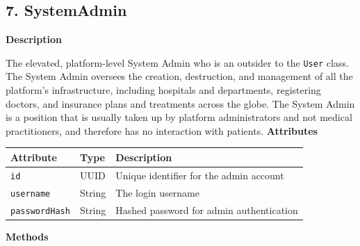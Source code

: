 \documentclass[12pt, a4paper]{article}
\begin{document}
\subsection{7. SystemAdmin}\label{sec:7-systemadmin}

\textbf{Description}

The elevated, platform-level System Admin who is an outsider to the \texttt{User} class. The System Admin oversees the creation, destruction, and management of all the platform's infrastructure, including hospitals and departments, registering doctors, and insurance plans and treatments across the globe. The System Admin is a position that is usually taken up by platform administrators and not medical practitioners, and therefore has no interaction with patients.
\textbf{Attributes}

\begin{center}
\small
\renewcommand{\arraystretch}{1.35}
\begin{tabularx}{\textwidth}{|>{\raggedright\arraybackslash}p{3.4cm}|>{\raggedright\arraybackslash}p{3.3cm}|Y|}
\hline
{}
\textbf{Attribute} & \textbf{Type} & \textbf{Description} \\ \hline
\texttt{id} & UUID & Unique identifier for the admin account \\ \hline
\texttt{username} & String & The login username \\ \hline
\texttt{passwordHash} & String & Hashed password for admin authentication \\ \hline
\end{tabularx}
\end{center}

\textbf{Methods}
\end{document}
